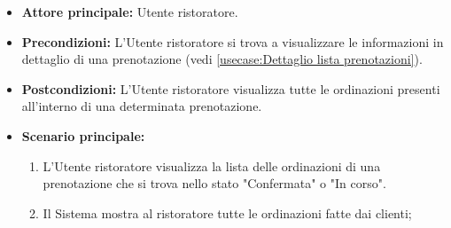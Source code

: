 \label{usecase:Consultazione lista ordinazioni}
\begin{itemize}
	\item \textbf{Attore principale:} Utente ristoratore.

	\item \textbf{Precondizioni:} L'Utente ristoratore si trova a visualizzare le informazioni in dettaglio di una prenotazione (vedi \autoref{usecase:Dettaglio lista prenotazioni}).

	\item \textbf{Postcondizioni:} L'Utente ristoratore visualizza tutte le ordinazioni presenti all'interno di una determinata prenotazione.

	\item \textbf{Scenario principale:}
	      \begin{enumerate}
		      \item L'Utente ristoratore visualizza la lista delle ordinazioni di una prenotazione che si trova nello stato "Confermata" o "In corso".
		      \item Il Sistema mostra al ristoratore tutte le ordinazioni fatte dai clienti;
	      \end{enumerate}
\end{itemize}


